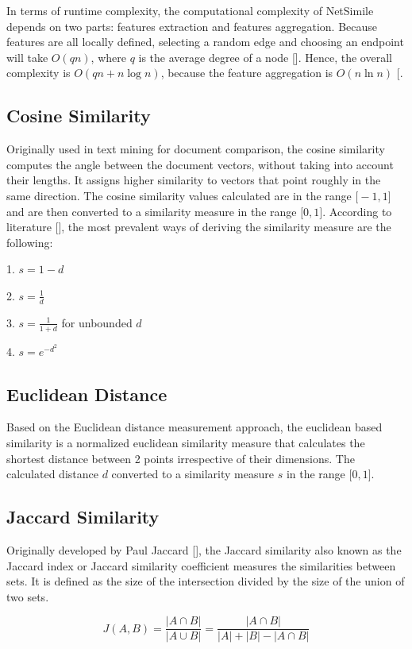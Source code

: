 In terms of runtime complexity, the computational complexity of NetSimile depends on two parts: features extraction and features aggregation. Because features are all locally defined, selecting a random edge and choosing an endpoint will take $O(q n)$, where $q$ is the average degree of a node [\cite{Henderson:2011}]. Hence, the overall complexity is $O(q n+n \log n)$, because the feature aggregation is $O(n \ln n)$ [\cite{Berlingerio:2012, Tsitsulin:2018}.

\subsection{Cosine Similarity}
Originally used in text mining for document comparison, the cosine similarity computes the angle between the document vectors, without taking into account their lengths. It assigns higher similarity to vectors that point roughly in the same direction. 
The cosine similarity values calculated are in the range $\mathrm[-1, 1]$ and are then converted to a similarity measure in the range $\mathrm[0, 1]$. According to literature [\cite{Han:2012}], the most prevalent ways of deriving the similarity measure are the following:

1. $s=1-d$

2. $s=\frac{1}{d}$

3. $s=\frac{1}{1+d}$ for unbounded $d$

4. $s=e^{-d^{2}}$

\subsection{Euclidean Distance}
Based on the Euclidean distance measurement approach, the euclidean based similarity  is a normalized euclidean similarity measure that calculates the shortest distance between 2 points irrespective of their dimensions.  The calculated distance $d$ converted to a similarity measure $s$ in the range $\mathrm[0, 1]$.

\subsection{Jaccard Similarity}
Originally developed by Paul Jaccard [\cite{Jaccard:1901}], the Jaccard similarity also known as the Jaccard index or Jaccard similarity coefficient measures the similarities between sets. It is defined as the size of the intersection divided by the size of the union of two sets.

\begin{equation}
J(A, B)=\frac{|A \cap B|}{|A \cup B|}=\frac{|A \cap B|}{|A|+|B|-|A \cap B|}
\end{equation}

